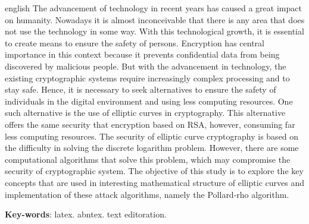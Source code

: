 \begin{resumo}[Abstract]
\begin{otherlanguage*}{english}
The advancement of technology in recent years has caused a great impact on humanity. Nowadays it is almost inconceivable that there is any area that does not use the technology in some way. With this technological growth, it is essential to create means to ensure the safety of persons. Encryption has central importance in this context because it prevents confidential data from being discovered by malicious people. But with the advancement in technology, the existing cryptographic systems require increasingly complex processing and to stay safe. Hence, it is necessary to seek alternatives to ensure the safety of individuals in the digital environment and using less computing resources. One such alternative is the use of elliptic curves in cryptography. This alternative offers the same security that encryption based on RSA, however, consuming far less computing resources. The security of elliptic curve cryptography is based on the difficulty in solving the discrete logarithm problem. However, there are some computational algorithms that solve this problem, which may compromise the security of cryptographic system. The objective of this study is to explore the key concepts that are used in interesting mathematical structure of elliptic curves and implementation of these attack algorithms, namely the Pollard-rho algorithm.

\vspace{\onelineskip}

\noindent 
\textbf{Key-words}: latex. abntex. text editoration.
\end{otherlanguage*}
\end{resumo}
